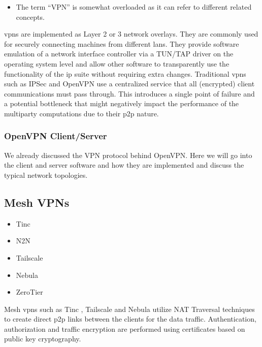 \begin{itemize}
\begin{itemize}

    \begin{itemize}
    \tightlist
    \item
      The term ``VPN'' is somewhat overloaded as it can refer to different related concepts.
    \end{itemize}

    \glspl{vpn} are implemented as Layer 2 or 3 network overlays. They are commonly used for securely connecting machines from different \glspl{lan}. They provide software emulation of a network interface controller via a TUN/TAP driver on the operating system level and allow other software to transparently use the functionality of the \gls{ip} suite without requiring extra changes. Traditional \glspl{vpn} such as IPSec \autocite{ipSecRFC} and OpenVPN \autocite{openVPNDocs} use a centralized service that all (encrypted) client communications must pass through. This introduces a single point of failure and a potential bottleneck that might negatively impact the performance of the multiparty computations due to their \gls{p2p} nature.
  \end{itemize}
\end{itemize}

\subsubsection{OpenVPN Client/Server}\label{thesis__022-overlays.md__openvpn-clientserver}

We already discussed the VPN protocol behind OpenVPN. Here we will go into the client and server software and how they are implemented and discuss the typical network topologies.

\subsection{Mesh VPNs}\label{thesis__022-overlays.md__mesh-vpns}

\begin{itemize}
\tightlist
\item
  Tinc
\item
  N2N
\item
  Tailscale
\item
  Nebula
\item
  ZeroTier
\end{itemize}

Mesh \glspl{vpn} such as Tinc \autocite{tincDocs}, Tailscale \autocite{tailscaleDocs} and Nebula \autocite{nebulaDocs} utilize NAT Traversal techniques to create direct \gls{p2p} links between the clients for the data traffic. Authentication, authorization and traffic encryption are performed using certificates based on public key cryptography.

